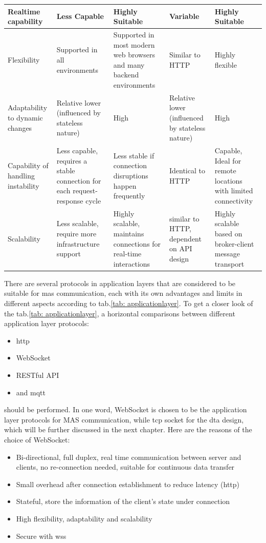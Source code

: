 \begin{table}
\begin{tabular}{|m{}|m{}|m{}|m{}|m{}|}
    Realtime capability & Less Capable & Highly Suitable & Variable & Highly Suitable \\ \hline
    Flexibility & Supported in all environments & Supported in most modern web browsers and many backend environments & Similar to HTTP & Highly flexible \\ \hline
    Adaptability to dynamic changes & Relative lower (influenced by stateless nature) & High & Relative lower (influenced by stateless nature) & High \\ \hline
    Capability of handling instability & Less capable, requires a stable connection for each request-response cycle & Less stable if connection disruptions happen frequently & Identical to HTTP & Capable, Ideal for remote locations with limited connectivity \\ \hline
    Scalability & Less scalable, require more infrastructure support & Highly scalable, maintains connections for real-time interactions & similar to HTTP, dependent on API design & Highly scalable based on broker-client message transport \\ \hline
    \end{tabular}
\end{table}

There are several protocols in application layers that are considered to be suitable for \gls{mas} communication, each with its own advantages and limits in different aspects according to tab.\ref{tab: applicationlayer}.
To get a closer look of the tab.\ref{tab: applicationlayer}, a horizontal comparisons between different application layer protocols: 

\begin{itemize}
    \item \gls{http}
    \item WebSocket
    \item RESTful API
    \item and \gls{mqtt}
\end{itemize}

should be performed. In one word, WebSocket is chosen to be the application layer protocols for MAS communication, while \gls{tcp} socket for the \gls{dta} design, which will be further discussed in the next chapter. Here are the reasons of the choice of WebSocket: 

\begin{itemize}
    \item Bi-directional, full duplex, real time communication between server and clients, no re-connection needed, suitable for continuous data transfer
    \item Small overhead after connection establishment to reduce latency (\gls{http})
    \item Stateful, store the information of the client's state under connection
    \item High flexibility, adaptability and scalability
    \item Secure with wss
\end{itemize}

